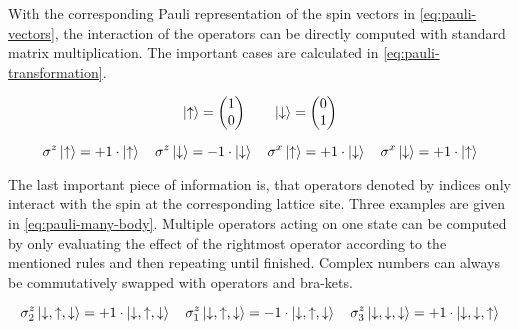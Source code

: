 With the corresponding Pauli representation of the spin vectors in \autoref{eq:pauli-vectors}, the interaction of the operators can be directly computed with standard matrix multiplication. The important cases are calculated in \autoref{eq:pauli-transformation}.

\begin{equation}
    \label{eq:pauli-vectors}
    \ket{\uparrow} = \left(\begin{matrix}
        1\\0
    \end{matrix}\right)
    \qquad
    \ket{\downarrow} = \left(\begin{matrix}
        0\\1
    \end{matrix}\right)
\end{equation}


\begin{equation}
    \label{eq:pauli-transformation}
    \sigma^z \ket{\uparrow} = +1 \cdot \ket{\uparrow} \quad
    \sigma^z \ket{\downarrow} = -1 \cdot \ket{\downarrow} \quad
    \sigma^x \ket{\uparrow} = +1 \cdot \ket{\downarrow} \quad
    \sigma^x \ket{\downarrow} = +1 \cdot \ket{\uparrow}
\end{equation}

The last important piece of information is, that operators denoted by indices only interact with the spin at the corresponding lattice site. Three examples are given in \autoref{eq:pauli-many-body}. Multiple operators acting on one state can be computed by only evaluating the effect of the rightmost operator according to the mentioned rules and then repeating until finished. Complex numbers can always be commutatively swapped with operators and bra-kets.

\begin{equation}
    \label{eq:pauli-many-body}
    \sigma^z_2 \ket{\downarrow, \uparrow, \downarrow} = +1 \cdot \ket{\downarrow, \uparrow, \downarrow} \quad
    \sigma^z_1 \ket{\downarrow, \uparrow, \downarrow} = -1 \cdot \ket{\downarrow, \uparrow, \downarrow} \quad
    \sigma^z_3 \ket{\downarrow, \downarrow, \downarrow} = +1 \cdot \ket{\downarrow, \downarrow, \uparrow}
\end{equation}  